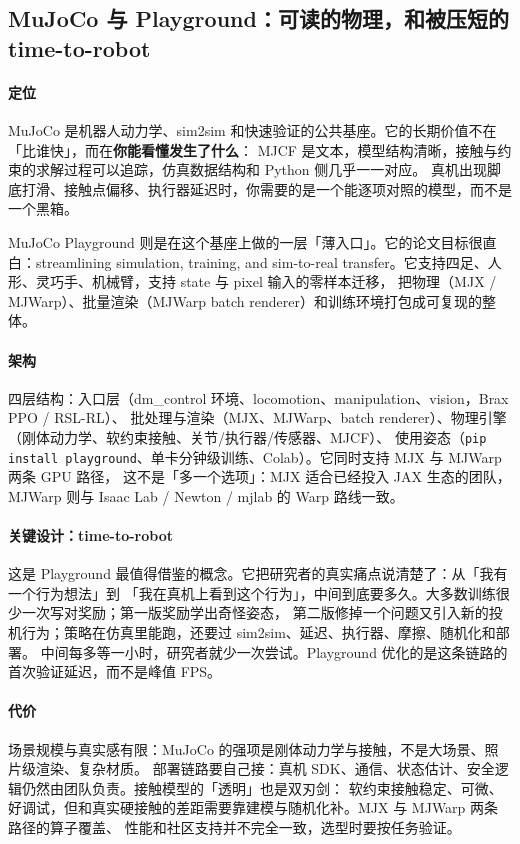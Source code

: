 \documentclass[UTF8, 11pt, a4paper, fontset=windows]{ctexart}
\newcommand{\term}[1]{\texttt{#1}}
\begin{document}
\subsection{MuJoCo 与 Playground：可读的物理，和被压短的 time-to-robot}

\paragraph{定位}
MuJoCo 是机器人动力学、sim2sim 和快速验证的公共基座。它的长期价值不在「比谁快」，而在\textbf{你能看懂发生了什么}：
MJCF 是文本，模型结构清晰，接触与约束的求解过程可以追踪，仿真数据结构和 Python 侧几乎一一对应。
真机出现脚底打滑、接触点偏移、执行器延迟时，你需要的是一个能逐项对照的模型，而不是一个黑箱。

MuJoCo Playground 则是在这个基座上做的一层「薄入口」。它的论文目标很直白：streamlining simulation, training,
and sim-to-real transfer。它支持四足、人形、灵巧手、机械臂，支持 state 与 pixel 输入的零样本迁移，
把物理（MJX / MJWarp）、批量渲染（MJWarp batch renderer）和训练环境打包成可复现的整体。

\paragraph{架构}
四层结构：入口层（dm\_control 环境、locomotion、manipulation、vision，Brax PPO / RSL-RL）、
批处理与渲染（MJX、MJWarp、batch renderer）、物理引擎（刚体动力学、软约束接触、关节/执行器/传感器、MJCF）、
使用姿态（\term{pip install playground}、单卡分钟级训练、Colab）。它同时支持 MJX 与 MJWarp 两条 GPU 路径，
这不是「多一个选项」：MJX 适合已经投入 JAX 生态的团队，MJWarp 则与 Isaac Lab / Newton / mjlab 的 Warp 路线一致。

\paragraph{关键设计：time-to-robot}
这是 Playground 最值得借鉴的概念。它把研究者的真实痛点说清楚了：从「我有一个行为想法」到
「我在真机上看到这个行为」，中间到底要多久。大多数训练很少一次写对奖励；第一版奖励学出奇怪姿态，
第二版修掉一个问题又引入新的投机行为；策略在仿真里能跑，还要过 sim2sim、延迟、执行器、摩擦、随机化和部署。
中间每多等一小时，研究者就少一次尝试。Playground 优化的是这条链路的首次验证延迟，而不是峰值 FPS。

\paragraph{代价}
场景规模与真实感有限：MuJoCo 的强项是刚体动力学与接触，不是大场景、照片级渲染、复杂材质。
部署链路要自己接：真机 SDK、通信、状态估计、安全逻辑仍然由团队负责。接触模型的「透明」也是双刃剑：
软约束接触稳定、可微、好调试，但和真实硬接触的差距需要靠建模与随机化补。MJX 与 MJWarp 两条路径的算子覆盖、
性能和社区支持并不完全一致，选型时要按任务验证。
\end{document}
